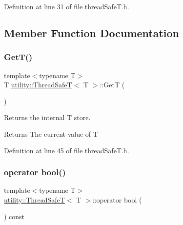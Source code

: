 Definition at line 31 of file thread\+Safe\+T.\+h.



\subsection{Member Function Documentation}
\mbox{\label{classutility_1_1ThreadSafeT_ad9e354cd1ee317c01c282ef2b75e786e}} 
\subsubsection{\texorpdfstring{GetT()}{GetT()}}
{\footnotesize\ttfamily template$<$typename T$>$ \\
T \mbox{\hyperlink{classutility_1_1ThreadSafeT}{utility\+::\+Thread\+SafeT}}$<$ T $>$\+::GetT (\begin{DoxyParamCaption}{ }\end{DoxyParamCaption})\hspace{0.3cm}{\ttfamily [inline]}}



Returns the internal T store. 

\begin{DoxyReturn}{Returns}
The current value of T 
\end{DoxyReturn}


Definition at line 45 of file thread\+Safe\+T.\+h.

\mbox{\label{classutility_1_1ThreadSafeT_a14a00e1e039c17524cc58808975c3198}} 
\subsubsection{\texorpdfstring{operator bool()}{operator bool()}}
{\footnotesize\ttfamily template$<$typename T$>$ \\
\mbox{\hyperlink{classutility_1_1ThreadSafeT}{utility\+::\+Thread\+SafeT}}$<$ T $>$\+::operator bool (\begin{DoxyParamCaption}{ }\end{DoxyParamCaption}) const\hspace{0.3cm}{\ttfamily [inline]}}



